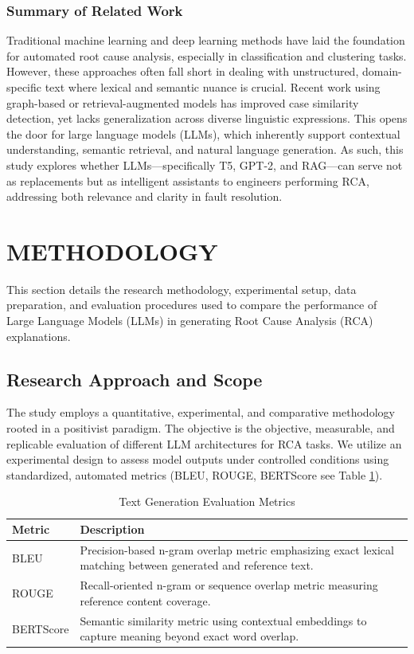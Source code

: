 \documentclass[10pt,twocolumn,journal]{IEEEtran}
\begin{document}
\subsubsection*{Summary of Related Work}
Traditional machine learning and deep learning methods have laid the foundation for automated root cause analysis, especially in classification and clustering tasks. However, these approaches often fall short in dealing with unstructured, domain-specific text where lexical and semantic nuance is crucial. Recent work using graph-based or retrieval-augmented models has improved case similarity detection, yet lacks generalization across diverse linguistic expressions. This opens the door for large language models (LLMs), which inherently support contextual understanding, semantic retrieval, and natural language generation. As such, this study explores whether LLMs—specifically T5, GPT-2, and RAG—can serve not as replacements but as intelligent assistants to engineers performing RCA, addressing both relevance and clarity in fault resolution.

\section{METHODOLOGY}
\label{sec:methodology}

This section details the research methodology, experimental setup, data preparation, and evaluation procedures used to compare the performance of Large Language Models (LLMs) in generating Root Cause Analysis (RCA) explanations.

\subsection{Research Approach and Scope}
\label{sec:research-approach}

The study employs a quantitative, experimental, and comparative methodology rooted in a positivist paradigm. The objective is the objective, measurable, and replicable evaluation of different LLM architectures for RCA tasks. We utilize an experimental design to assess model outputs under controlled conditions using standardized, automated metrics (BLEU, ROUGE, BERTScore see Table \ref{tab:evaluation_metrics}).

\begin{table}[h]
\centering
\caption{Text Generation Evaluation Metrics}
\label{tab:evaluation_metrics}
\begin{tabular}{lp{6.2cm}}
\hline
\textbf{Metric} & \textbf{Description} \\
\hline
BLEU & Precision-based n-gram overlap metric emphasizing exact lexical matching between generated and reference text. \\
ROUGE & Recall-oriented n-gram or sequence overlap metric measuring reference content coverage. \\
BERTScore & Semantic similarity metric using contextual embeddings to capture meaning beyond exact word overlap. \\
\hline
\end{tabular}
\end{table}
\end{document}
